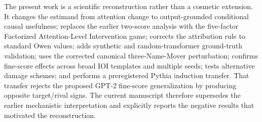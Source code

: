 \documentclass[11pt]{article}
\begin{document}
The present work is a scientific reconstruction rather than a cosmetic extension. It changes the estimand from attention change to output-grounded conditional causal usefulness; replaces the earlier two-score analysis with the five-factor Factorized Attention-Level Intervention game; corrects the attribution rule to standard Owen values; adds synthetic and random-transformer ground-truth validation; uses the corrected canonical three-Name-Mover perturbation; confirms fine-score effects across broad IOI templates and multiple seeds; tests alternative damage schemes; and performs a preregistered Pythia induction transfer. That transfer rejects the proposed GPT-2 fine-score generalization by producing opposite target/rival signs. The current manuscript therefore supersedes the earlier mechanistic interpretation and explicitly reports the negative results that motivated the reconstruction.
\end{document}
